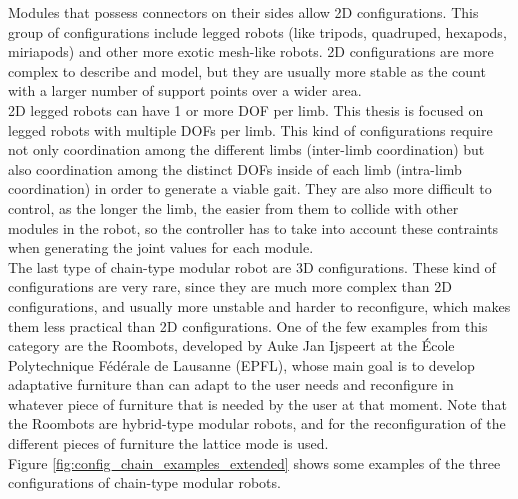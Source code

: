 Modules that possess connectors on their sides allow 2D configurations. This group of configurations include legged robots (like tripods, quadruped, hexapods, miriapods) and other more exotic mesh-like robots.
2D configurations are more complex to describe and model, but they are usually more stable as the count with a larger number of support points over a wider area.\\

2D legged robots can have 1 or more DOF per limb. This thesis is focused on legged robots with multiple DOFs per limb. This kind of configurations require not only coordination among the different limbs (inter-limb coordination) but also coordination among the distinct DOFs inside of each limb (intra-limb coordination) in order to generate a viable gait. They are also more difficult to control, as the longer the limb, the easier from them to collide with other modules in the robot, so the controller has to take into account these contraints when generating the joint values for each module.\\

The last type of chain-type modular robot are 3D configurations. These kind of configurations are very rare, since they are much more complex than 2D configurations, and usually more unstable and harder to reconfigure, which makes them less practical than 2D configurations. One of the few examples from this category are the Roombots, developed by Auke Jan Ijspeert at the École Polytechnique Fédérale de Lausanne (EPFL)\cite{Sprowitz2010}, whose main goal is to develop adaptative furniture than can adapt to the user needs and reconfigure in whatever piece of furniture that is needed by the user at that moment. Note that the Roombots are hybrid-type modular robots, and for the reconfiguration of the different pieces of furniture the lattice mode is used.\\

Figure \ref{fig:config_chain_examples_extended} shows some examples of the three configurations of chain-type modular robots.\\

